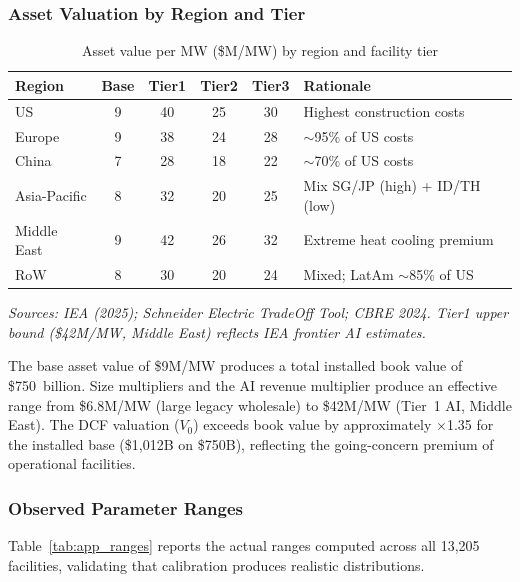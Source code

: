 \subsubsection{Asset Valuation by Region and Tier}

\begin{table}[H]
\centering
\small
\caption{Asset value per MW (\$M/MW) by region and facility tier}
\label{tab:app_asset_value}
\begin{tabular}{@{}lccccl@{}}
\toprule
\textbf{Region} & \textbf{Base} & \textbf{Tier1} & \textbf{Tier2} & \textbf{Tier3} & \textbf{Rationale} \\
\midrule
US & 9 & 40 & 25 & 30 & Highest construction costs \\
Europe & 9 & 38 & 24 & 28 & $\sim$95\% of US costs \\
China & 7 & 28 & 18 & 22 & $\sim$70\% of US costs \\
Asia-Pacific & 8 & 32 & 20 & 25 & Mix SG/JP (high) + ID/TH (low) \\
Middle East & 9 & 42 & 26 & 32 & Extreme heat cooling premium \\
RoW & 8 & 30 & 20 & 24 & Mixed; LatAm $\sim$85\% of US \\
\bottomrule
\end{tabular}
\end{table}

\small\textit{Sources: IEA (2025); Schneider Electric TradeOff Tool; CBRE 2024. Tier1 upper
bound (\$42M/MW, Middle East) reflects IEA frontier AI estimates.}
\normalsize

\vspace{0.2cm}
The base asset value of \$9M/MW produces a total installed book value of \$750~billion.
Size multipliers and the AI revenue multiplier produce an effective range from \$6.8M/MW
(large legacy wholesale) to \$42M/MW (Tier~1 AI, Middle East). The DCF valuation ($V_0$)
exceeds book value by approximately $\times$1.35 for the installed base (\$1{,}012B on
\$750B), reflecting the going-concern premium of operational facilities.


\subsubsection{Observed Parameter Ranges}

Table~\ref{tab:app_ranges} reports the actual ranges computed across all 13{,}205
facilities, validating that calibration produces realistic distributions.

